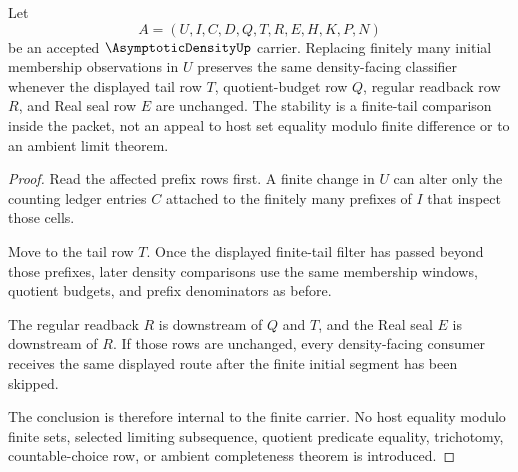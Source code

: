 \begin{theorem}
\label{thm:asymptotic-density-finite-prefix-stability}
Let
$$
A=(U,I,C,D,Q,T,R,E,H,K,P,N)
$$
be an accepted $\AsymptoticDensityUp$ carrier. Replacing finitely many initial membership observations in $U$ preserves the same density-facing classifier whenever the displayed tail row $T$, quotient-budget row $Q$, regular readback row $R$, and Real seal row $E$ are unchanged. The stability is a finite-tail comparison inside the packet, not an appeal to host set equality modulo finite difference or to an ambient limit theorem.
\end{theorem}
\begin{proof}
Read the affected prefix rows first. A finite change in $U$ can alter only the counting ledger entries $C$ attached to the finitely many prefixes of $I$ that inspect those cells.

Move to the tail row $T$. Once the displayed finite-tail filter has passed beyond those prefixes, later density comparisons use the same membership windows, quotient budgets, and prefix denominators as before.

The regular readback $R$ is downstream of $Q$ and $T$, and the Real seal $E$ is downstream of $R$. If those rows are unchanged, every density-facing consumer receives the same displayed route after the finite initial segment has been skipped.

The conclusion is therefore internal to the finite carrier. No host equality modulo finite sets, selected limiting subsequence, quotient predicate equality, trichotomy, countable-choice row, or ambient completeness theorem is introduced.
\end{proof}



